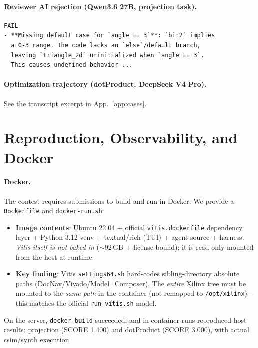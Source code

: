 \documentclass[10pt,conference,letterpaper]{IEEEtran}
\begin{document}
\paragraph{Reviewer AI rejection (Qwen3.6 27B, projection task).}
\begin{footnotesize}
\begin{verbatim}
FAIL
- **Missing default case for `angle == 3`**: `bit2` implies
  a 0-3 range. The code lacks an `else`/default branch,
  leaving `triangle_2d` uninitialized when `angle == 3`.
  This causes undefined behavior ...
\end{verbatim}
\end{footnotesize}

\paragraph{Optimization trajectory (dotProduct, DeepSeek V4 Pro).} See the transcript excerpt in App.~\ref{app:cases}.

\section{Reproduction, Observability, and Docker}
\label{app:repro}

\paragraph{Docker.} The contest requires submissions to build and run in Docker. We provide a \texttt{Dockerfile} and \texttt{docker-run.sh}:
\begin{itemize}
    \item \textbf{Image contents}: Ubuntu 22.04 + official \texttt{vitis.dockerfile} dependency layer + Python 3.12 venv + textual/rich (TUI) + agent source + harness. \emph{Vitis itself is not baked in} ($\sim$92\,GB + license-bound); it is read-only mounted from the host at runtime.
    \item \textbf{Key finding}: Vitis \texttt{settings64.sh} hard-codes sibling-directory absolute paths (DocNav/Vivado/Model\_Composer). The \emph{entire} Xilinx tree must be mounted to the \emph{same path} in the container (not remapped to \texttt{/opt/xilinx})---this matches the official \texttt{run-vitis.sh} model.
\end{itemize}
On the server, \texttt{docker build} succeeded, and in-container runs reproduced host results: projection (SCORE 1.400) and dotProduct (SCORE 3.000), with actual csim/synth execution.
\end{document}

